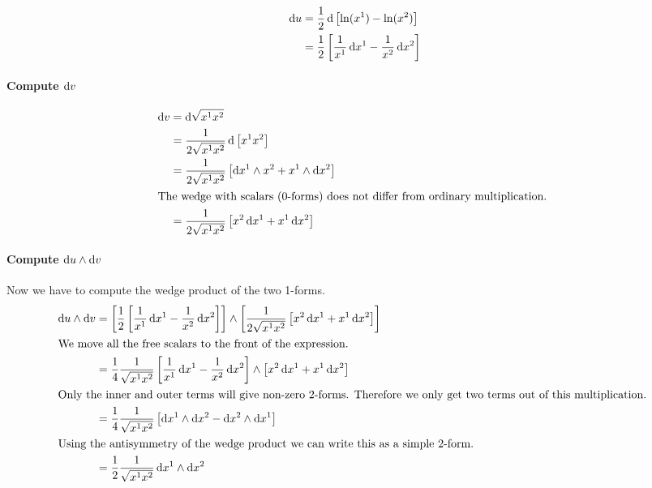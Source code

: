 \documentclass[11pt, english, fleqn, DIV=15, headinclude, BCOR=1cm]{scrartcl}
\begin{document}
\begin{align*}
    \mathop{}\!\mathrm d u
    &= \frac12 \mathop{}\!\mathrm d \left[ \ln(x^1) - \ln(x^2) \right] \\
    &= \frac12 \left[ \frac{1}{x^1} \mathop{}\!\mathrm d x^1 - \frac{1}{x^2} \mathop{}\!\mathrm d x^2 \right]
\end{align*}

\paragraph{Compute $\mathop{}\!\mathrm d v$}

\begin{align*}
    \dif v
    &= \dif \sqrt{x^1 x^2} \\
    &= \frac{1}{2 \sqrt{x^1 x^2}} \dif \sbr{x^1 x^2} \\
    &= \frac{1}{2 \sqrt{x^1 x^2}} \sbr{\dif x^1 \wedge x^2 + x^1 \wedge \dif x^2} \\
    \intertext{%
        The wedge with scalars (0-forms) does not differ from ordinary
        multiplication.
    }
    &= \frac{1}{2 \sqrt{x^1 x^2}} \sbr{x^2 \dif x^1 + x^1 \dif x^2}
\end{align*}

\paragraph{Compute $\mathop{}\!\mathrm d u \wedge \mathop{}\!\mathrm d v$}

Now we have to compute the wedge product of the two 1-forms.
\begin{align*}
    \dif u \wedge \dif v
    &= \sbr{\frac12 \sbr{\frac{1}{x^1} \dif x^1 - \frac{1}{x^2} \dif x^2}}
    \wedge \sbr{\frac{1}{2 \sqrt{x^1 x^2}} \sbr{x^2 \dif x^1 + x^1 \dif x^2}}
    \\
    \intertext{%
        We move all the free scalars to the front of the expression.
    }
    &= \frac14 \frac{1}{\sqrt{x^1 x^2}} \sbr{\frac{1}{x^1} \dif x^1 - \frac{1}{x^2} \dif x^2}
    \wedge \sbr{x^2 \dif x^1 + x^1 \dif x^2}
    \\
    \intertext{%
        Only the inner and outer terms will give non-zero 2-forms. Therefore we
        only get two terms out of this multiplication.
    }
    &= \frac14 \frac{1}{\sqrt{x^1 x^2}} \sbr{\dif x^1 \wedge \dif x^2 - \dif
    x^2 \wedge \dif x^1} \\
    \intertext{%
        Using the antisymmetry of the wedge product we can write this as a
        simple 2-form.
    }
    &= \frac12 \frac{1}{\sqrt{x^1 x^2}} \dif x^1 \wedge \dif x^2
\end{align*}
\end{document}
